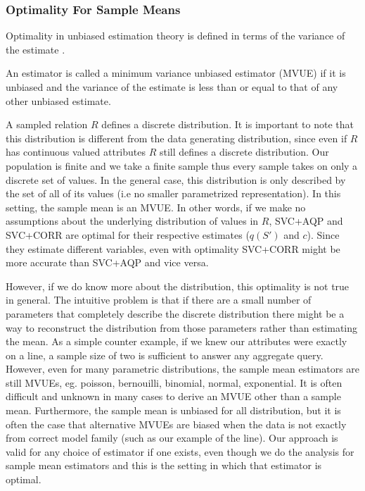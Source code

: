 \subsubsection{Optimality For Sample Means}
Optimality in unbiased estimation theory is defined in terms of the variance of the estimate \cite{cox1979theoretical}.
\begin{proposition}
An estimator is called a minimum variance unbiased estimator (MVUE) if it is unbiased and the variance of the estimate is less than or equal to that of any other unbiased estimate.
\end{proposition}

A sampled relation $R$ defines a discrete distribution. It is important to note that this distribution is different from the data generating distribution, since even if $R$ has continuous valued attributes $R$ still defines a discrete distribution. Our population is finite and we take a finite sample thus every sample takes on only a discrete set of values. In the general case, this distribution is only described by the set of all of its values (i.e no smaller parametrized representation). In this setting, the sample mean is an MVUE. In other words, if we make no assumptions about the underlying distribution of values in $R$, SVC+AQP and SVC+CORR are optimal for their respective estimates ($q(S')$ and $c$). Since they estimate different variables, even with optimality SVC+CORR might be more accurate than SVC+AQP and vice versa. 

However, if we do know more about the distribution, this optimality is not true in general. The intuitive problem is that if there are a small number of parameters that completely describe the discrete distribution there might be a way to reconstruct the distribution from those parameters rather than estimating the mean. As a simple counter example, if we knew our attributes were exactly on a line, a sample size of two is sufficient to answer any aggregate query. However, even for many parametric distributions, the sample mean estimators are still MVUEs, eg. poisson, bernouilli, binomial, normal, exponential. It is often difficult and unknown in many cases to derive an MVUE other than a sample mean. Furthermore, the sample mean is unbiased for all distribution, but it is often the case that alternative MVUEs are biased when the data is not exactly from correct model family (such as our example of the line). Our approach is valid for any choice of estimator if one exists, even though we do the analysis for sample mean estimators and this is the setting in which that estimator is optimal.

